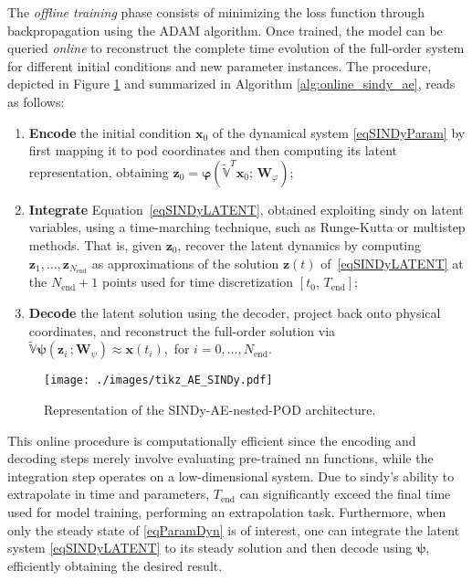 \documentclass[reqno]{amsart}[standalone]
\theoremstyle{definition}
\theoremstyle{remark}
\newcommand{\bs}{\boldsymbol}
\begin{document}
The \textit{offline training} phase consists of minimizing the loss function through backpropagation using the ADAM algorithm. Once trained, the model can be queried \textit{online} to reconstruct the complete time evolution of the full-order system for different initial conditions and new parameter instances.
%
The procedure, depicted in Figure \ref{figPOD_AE_SINDy} and
summarized in Algorithm \ref{alg:online_sindy_ae}, reads as follows:
 \begin{enumerate}[label=(\roman*)]
    \item\label{ItemInitCondCompress} \textbf{Encode} the initial condition $\bs{x}_0$ of the dynamical system \eqref{eqSINDyParam} by first mapping it to \gls{pod} coordinates and then computing its latent representation, obtaining $\bs{z}_0 = \bs{\varphi}(\tilde{\mathbb{V}}^T\bs{x}_0;\, \bs{W}_\varphi)$;

     \item\label{ItemLatentIntegration} \textbf{Integrate} Equation~\eqref{eqSINDyLATENT}, obtained exploiting \gls{sindy} on latent variables, using a time-marching technique, such as Runge-Kutta or multistep methods.
     That is, given $\bs{z}_0$, recover the latent dynamics by computing $\bs{z}_1, \dots, \bs{z}_{N_\text{end}}$ as approximations of the solution $\bs{z}(t)$ of~\eqref{eqSINDyLATENT} at the $N_\text{end}+1$ points used for time discretization $[t_0,\, T_\text{end}]$;

     \item\label{ItemDecompression} \textbf{Decode} the latent solution using the decoder, project back onto physical coordinates, and reconstruct the full-order solution via $\tilde{\mathbb{V}}\bs{\psi}(\bs{z}_i\,; \bs{W}_\psi)\approx \bs{x}(t_i),$ for $i = 0, \dots, N_{\text{end}}$.
 \end{enumerate}

\begin{figure}[ht]
    \centering
    \texttt{[image: ./images/tikz\_AE\_SINDy.pdf]}
    \caption{Representation of the SINDy-AE-nested-POD architecture.}
    \label{figPOD_AE_SINDy}
\end{figure}

This online procedure is computationally efficient since the encoding and decoding steps merely involve evaluating pre-trained \gls{nn} functions, while the integration step operates on a low-dimensional system. Due to \gls{sindy}'s ability to extrapolate in time and parameters, $T_{\text{end}}$ can significantly exceed the final time used for model training, performing an extrapolation task. Furthermore, when only the steady state of \eqref{eqParamDyn} is of interest, one can integrate the latent system \eqref{eqSINDyLATENT} to its steady solution and then decode using $\bs{\psi}$, efficiently obtaining the desired result.
\end{document}
